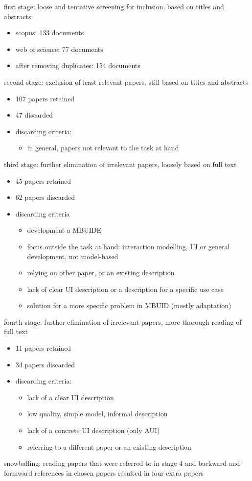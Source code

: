 first stage: loose and tentative screening for inclusion, based on titles and abstracts:
\begin{itemize}
    \item scopus: 133 documents
    \item web of science: 77 documents
    \item after removing duplicates: 154 documents
\end{itemize}

second stage: exclusion of least relevant papers, still based on titles and abstracts
\begin{itemize}
    \item 107 papers retained
    \item 47 discarded
    \item {}discarding criteria:
    \begin{itemize}
        \item in general, papers not relevant to the task at hand
    \end{itemize}
\end{itemize}

third stage: further elimination of irrelevant papers, loosely based on full text
\begin{itemize}
    \item 45 papers retained
    \item 62 papers discarded
    \item {}discarding criteria
    \begin{itemize}
        \item development a MBUIDE
        \item focus outside the task at hand: interaction modelling, UI or general development, not model-based
        \item relying on other paper, or an existing description
        \item lack of clear UI description or a description for a specific use case
        \item solution for a more specific problem in MBUID (mostly adaptation)
    \end{itemize}
\end{itemize}

fourth stage: further elimination of irrelevant papers, more thorough reading of full text
\begin{itemize}
    \item 11 papers retained
    \item 34 papers discarded
    \item {}discarding criteria:
    \begin{itemize}
        \item lack of a clear UI description
        \item low quality, simple model, informal description
        \item lack of a concrete UI description (only AUI)
        \item referring to a different paper or an existing description
    \end{itemize}
\end{itemize}

snowballing: reading papers that were referred to in stage 4 and backward and formward references in chosen papers
resulted in four extra papers
